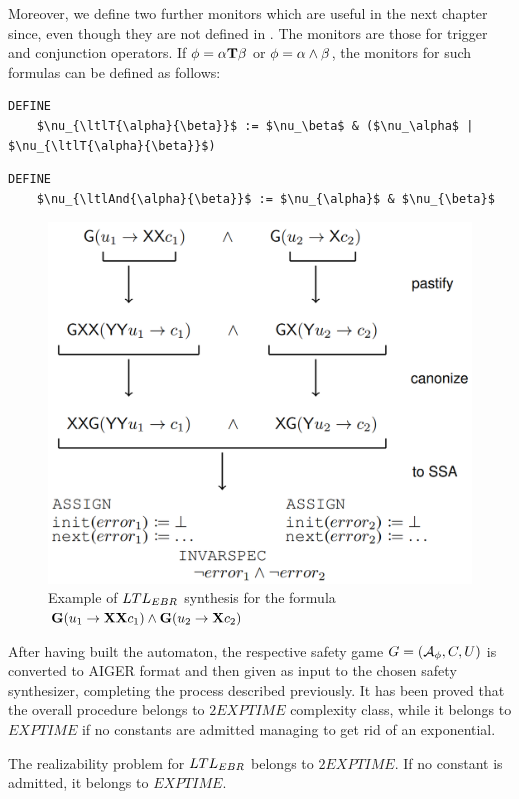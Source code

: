 Moreover, we define two further monitors which are useful in the next chapter since, even though they are not defined in \cite{geatti-2020-08}.
The monitors are those for trigger and conjunction operators.
If $\phi = \alpha \mathbf{T} \beta$ or $\phi = \alpha \land \beta$, the monitors for such formulas can be defined as follows:
\begin{lstlisting}[language=smv, mathescape=true, caption=$\ebrltl$: trigger monitor]
DEFINE
    $\nu_{\ltlT{\alpha}{\beta}}$ := $\nu_\beta$ & ($\nu_\alpha$ | $\nu_{\ltlT{\alpha}{\beta}}$)
\end{lstlisting}
\begin{lstlisting}[language=smv, mathescape=true, caption=$\ebrltl$: conjunction monitor]
DEFINE
    $\nu_{\ltlAnd{\alpha}{\beta}}$ := $\nu_{\alpha}$ & $\nu_{\beta}$
\end{lstlisting}


\begin{figure}[!htp]
    \centering
    \includegraphics[width=0.6\linewidth]{figures/ebr-ltl-synthesis-example.png}
    \caption{\cite{geatti-2020-08} Example of $LTL_{EBR}$ synthesis for the formula $\mathbf{G} (u_1 \to \mathbf{X} \mathbf{X} c_1) \land \mathbf{G} (u_2 \to \mathbf{X} c_2)$}
    \label{fig:ebr-ltl-synthesis-example}
\end{figure}

After having built the automaton, the respective safety game $G = \left( \mathcal{A}_\phi, C, U \right)$ is converted to AIGER format and then given as input to the chosen safety synthesizer, completing the process described previously. It has been proved that the overall procedure belongs to $2EXPTIME$ complexity class, while it belongs to $EXPTIME$ if no constants are admitted managing to get rid of an exponential.

\begin{proposition}
The realizability problem for $LTL_{EBR}$ belongs to $2EXPTIME$. 
If no constant is admitted, it belongs to $EXPTIME$.
\end{proposition}


